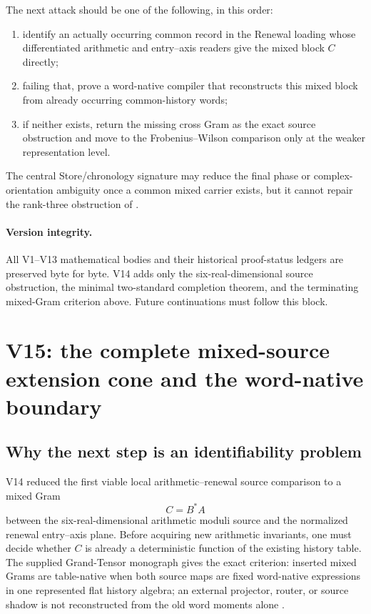 \documentclass[11pt]{article}
\theoremstyle{definition}
\theoremstyle{remark}
\begin{document}
The next attack should be one of the following, in this order:
\begin{enumerate}[label=\textup{(N\arabic*)},leftmargin=3em]
\item identify an actually occurring common record in the Renewal loading
      whose differentiated arithmetic and entry--axis readers give the mixed
      block $C$ directly;
\item failing that, prove a word-native compiler that reconstructs this mixed
      block from already occurring common-history words;
\item if neither exists, return the missing cross Gram as the exact source
      obstruction and move to the Frobenius--Wilson comparison only at the
      weaker representation level.
\end{enumerate}

The central Store/chronology signature may reduce the final phase or complex-
orientation ambiguity once a common mixed carrier exists, but it cannot repair
the rank-three obstruction of .

\paragraph{Version integrity.}
All V1--V13 mathematical bodies and their historical proof-status ledgers are
preserved byte for byte.  V14 adds only the six-real-dimensional source
obstruction, the minimal two-standard completion theorem, and the terminating
mixed-Gram criterion above.  Future continuations must follow this block.

\section{V15: the complete mixed-source extension cone and the word-native boundary}
\label{sec:v15-context}

\subsection{Why the next step is an identifiability problem}
V14 reduced the first viable local arithmetic--renewal source comparison to a
mixed Gram
\[
 C=B^*A
\]
between the six-real-dimensional arithmetic moduli source and the normalized
renewal entry--axis plane.  Before acquiring new arithmetic invariants, one
must decide whether $C$ is already a deterministic function of the existing
history table.  The supplied Grand-Tensor monograph gives the exact criterion:
inserted mixed Grams are table-native when both source maps are fixed
word-native expressions in one represented flat history algebra; an external
projector, router, or source shadow is not reconstructed from the old word
moments alone \cite{GT77}.
\end{document}
